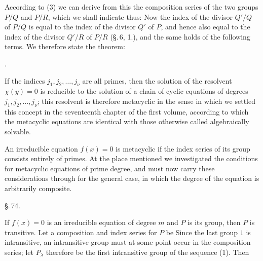 
According to (3) we can derive from this the composition series of the two groups $P/Q$
and $P/R$, which we shall indicate thus:
Now the index of the divisor $Q'/Q$ of $P/Q$ is equal to the index of the divisor $Q'$
of $P$, and hence also equal to the index of the divisor $Q'/R$ of $P/R$ (\S.\,6, 1.), and
the same holds of the following terms. We therefore state the theorem:

.  %

If the indices $j_1, j_2, \ldots, j_\nu$ are all primes, then the solution
of the resolvent $\chi(y) = 0$ is reducible to the solution of a chain of cyclic
equations of degrees $j_1, j_2, \ldots, j_\nu$; this resolvent is
therefore metacyclic in the sense in which we settled this concept in the seventeenth chapter
of the first volume, according to which the metacyclic equations are
identical with those otherwise called algebraically solvable.

An irreducible equation $f(x) = 0$ is metacyclic if the index series of its
group consists entirely of primes. At the place mentioned we investigated the
conditions for metacyclic equations of prime degree, and
must now carry these considerations through for the general case, in which
the degree of the equation is arbitrarily composite.

\begin{center}
\S.\,74.

\medskip

\end{center}

\bigskip

If $f(x) = 0$ is an irreducible equation of degree $m$ and $P$ is its
 group, then $P$ is transitive. Let a composition and index series
for $P$ be
Since the last group $1$ is intransitive, an intransitive group must at some point
occur in the composition series; let $P_\lambda$ therefore be the first
intransitive group of the sequence (1). Then
